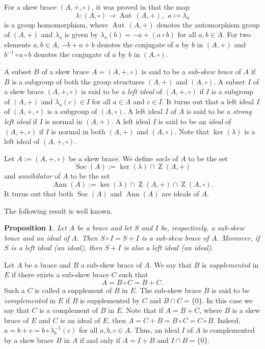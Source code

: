\documentclass[11pt]{amsart}
\theoremstyle{thrm}
\theoremstyle{plain}
\newtheorem{prop}[thm]{Proposition}
\theoremstyle{definition}
\newcommand{\Z}{\operatorname{Z} }
\newcommand{\Aut}{\operatorname{Aut} }
\newcommand{\Ker}{\operatorname{ker} }
\newcommand{\Ann}{\operatorname{Ann} }
\newcommand{\Soc}{\operatorname{Soc} }
\numberwithin{equation}{section}
\begin{document}
For a skew  brace $(A, +, \circ)$, it was  proved in \cite{GV17} that the map
$$
\lambda  :  (A, \circ) \to \Aut \, (A, +),~~a \mapsto \lambda_a
$$
is a group homomorphism, where $\Aut \, (A, +)$ denotes the automorphism  group of $(A, +)$ and $\lambda_a$ is given by $\lambda_a(b) = - a + (a \circ b)$ for all $a, b \in A$.  
For two elements $a, b \in A$,  $-b + a + b$ denotes the conjugate of $a$ by $b$ in $(A, +)$ and    $ b^{-1} \circ a \circ b$ denotes  the conjugate of $a$ by $b$ in $(A, \circ)$. 

A subset $B$ of a skew  brace $A = (A, +, \circ)$ is said to be a {\it sub-skew brace} of  $A$ if $B$ is a subgroup of both the group structures $(A, +)$ and $(A, \circ)$. A subset $I$ of a skew  brace $(A, +, \circ)$ is said to be a \emph{ left ideal } of $(A, +, \circ)$ if $I$ is a  subgroup of $(A, +)$ and $\lambda_a(c) \in I$ for all $a \in A$ and $c \in I$. It turns out that a left ideal $I$ of $(A, +, \circ)$ is a subgroup of $(A, \circ)$. A left ideal $I$ of $A$ is said to be  a \emph{strong left ideal} if $I$ is normal in $(A, +)$. A left ideal $I$ is said to be an \emph{ideal} of  $(A, +, \circ)$ if $I$ is normal in both $(A, +)$ and  $(A, \circ)$.  Note that $\Ker(\lambda)$ is a left  ideal of $(A, +, \circ)$.


Let $A := (A, +, \circ)$ be a skew  brace. We define {\it socle} of $A$ to be the set 
$$\Soc(A) := \Ker(\lambda) \cap \Z(A, +)$$
 and {\it annihilator} of $A$ to be the set 
 $$\Ann(A) :=  \Ker(\lambda) \cap \Z(A, +) \cap \Z(A, \circ).$$ 
 It turns out that both $\Soc(A)$ and $\Ann(A)$ are ideals of $A$.



The following result is well known.
\begin{prop}
	Let $A$ be a brace and let $S$ and $I$ be, respectively, a sub-skew brace and an ideal of $A$. Then $S \circ I = S + I$ is a sub-skew brace of $A$. Moreover, if $S$ is  a left ideal (an ideal), then $S + I$ is also  a left ideal (an ideal).
\end{prop}

	Let $A$ be a brace and $B$  a sub-skew brace of $A$. We say that $B$ is {\it supplemented} in $E$ if  there exists a sub-skew brace $C$ such that
$$A = B \circ C =  B + C.$$
Such a $C$ is called a supplement of $B$ in $E$.
The sub-skew brace  $B$ is said to be  \emph{complemented} in $E$ if $B$ is supplemented by  $C$ and 
$B \cap C = \{0\}$. In this case we say that $C$ is a complement of $B$ in $E$.
Note that if $A =  B + C$, where $B$  is a skew brace of $E$ and $C$ is an ideal of $E$, then $A = C + B = B \circ C = C \circ B$. Indeed, $a = b + c = b \circ \lambda^{-1}_b(c)$ for all $a, b, c \in A$. Thus, an ideal $I$ of $A$ is complemented by a skew brace $B$ in $A$ if and only if $A = I + B$ and $I \cap B =  \{0\}$.
\end{document}
